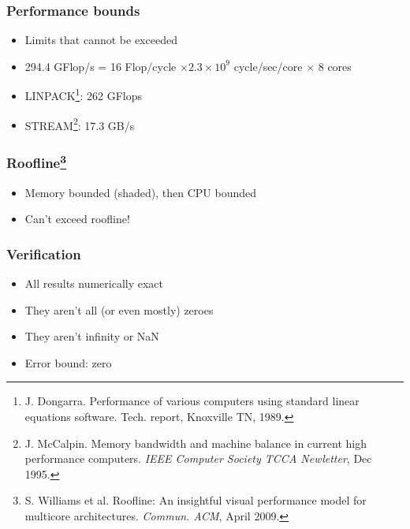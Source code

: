 \documentclass{beamer}
\begin{document}
\begin{frame}
\frametitle{Performance bounds}

\begin{itemize}
	\item Limits that cannot be exceeded
	\item 294.4 GFlop/s = 16 Flop/cycle \(\times 2.3 \times 10^9\) cycle/sec/core \(\times\) 8 cores
	\item LINPACK\footnote{J. Dongarra. Performance of various computers using standard linear equations software. Tech. report, Knoxville TN, 1989.}: 262 GFlops
	\item STREAM\footnote{J. McCalpin. Memory bandwidth and machine balance in current high performance computers. \emph{IEEE Computer Society TCCA Newletter}, Dec 1995.}: 17.3 GB/s
\end{itemize}
\end{frame}



\begin{frame}
\frametitle{Roofline\footnote{S. Williams et al. Roofline: An insightful visual performance model for multicore architectures. \emph{Commun. ACM}, April 2009.}}

\begin{center}
\end{center}

\begin{itemize}
	\item Memory bounded (shaded), then CPU bounded
	\item Can't exceed roofline!
\end{itemize}
\end{frame}



\begin{frame}
\frametitle{Verification}

\begin{itemize}
	\item All results numerically exact \Smiley
	\item They aren't all (or even mostly) zeroes
	\item They aren't infinity or NaN
	\item Error bound: zero
\end{itemize}
\end{frame}
\end{document}
